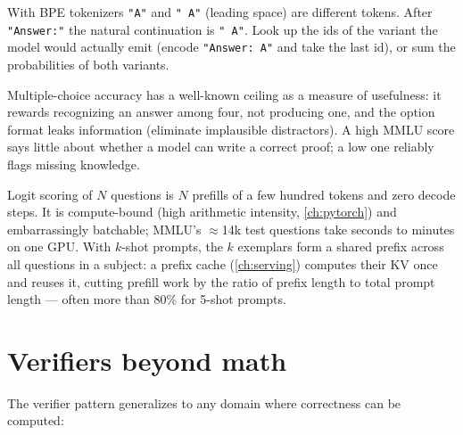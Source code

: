 \begin{pitfall}
With BPE tokenizers \texttt{"A"} and \texttt{" A"} (leading space) are different tokens. After
\texttt{"Answer:"} the natural continuation is \texttt{" A"}. Look up the ids of the variant the
model would actually emit (encode \texttt{"Answer: A"} and take the last id), or sum the
probabilities of both variants.
\end{pitfall}

Multiple-choice accuracy has a well-known ceiling as a measure of usefulness: it rewards
recognizing an answer among four, not producing one, and the option format leaks information
(eliminate implausible distractors). A high MMLU score says little about whether a model can
write a correct proof; a low one reliably flags missing knowledge.

\begin{systemslens}
Logit scoring of $N$ questions is $N$ prefills of a few hundred tokens and zero decode steps. It is
compute-bound (high arithmetic intensity, \cref{ch:pytorch}) and embarrassingly batchable; MMLU's
$\approx$14k test questions take seconds to minutes on one GPU. With $k$-shot prompts, the
$k$ exemplars form a shared prefix across all questions in a subject: a prefix cache
(\cref{ch:serving}) computes their KV once and reuses it, cutting prefill work by the ratio of
prefix length to total prompt length --- often more than 80\% for 5-shot prompts.
\end{systemslens}

\section{Verifiers beyond math}\label{sec:eval:beyond}

The verifier pattern generalizes to any domain where correctness can be computed:

